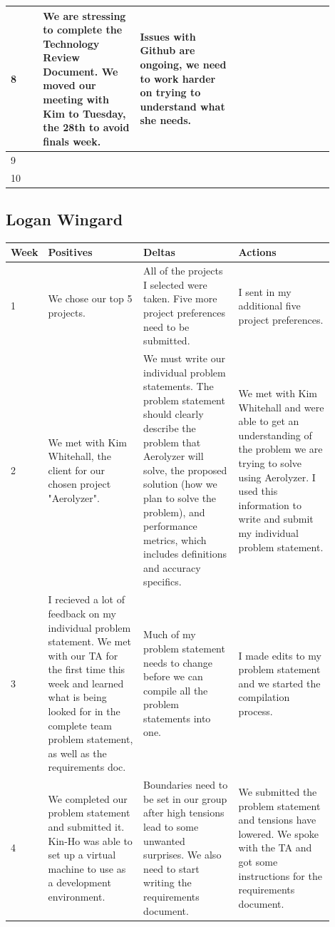 \documentclass[onecolumn, draftclsnofoot,10pt, compsoc]{IEEEtran}
\begin{document}
\begin{singlespace}
\begin{longtable}{|l|p{0.3\linewidth}|p{0.3\linewidth}|p{0.3\linewidth}|}
		8	&
			We are stressing to complete the Technology Review Document.
			We moved our meeting with Kim to Tuesday, the 28th to avoid finals week.
			&
			Issues with Github are ongoing, we need to work harder on trying to understand what she needs.
			&

			\\\hline

		9	&
			&
			&
			\\\hline

		10	&
			&
			&
			\\\hline
		\end{longtable}
		\subsection{Logan Wingard}
		\begin{longtable}{|l|p{0.3\linewidth}|p{0.3\linewidth}|p{0.3\linewidth}|}\hline \textbf{Week} & \textbf{Positives} & \textbf{Deltas} & \textbf{Actions}\\\hline
		1 	& We chose our top 5 projects. & All of the projects I selected were taken. Five more project preferences need to be submitted. & I sent in my additional five project preferences. \\\hline

		2 	& We met with Kim Whitehall, the client for our chosen project "Aerolyzer". & We must write our individual problem statements. The problem statement should clearly describe the problem that Aerolyzer will solve, the proposed solution (how we plan to solve the problem), and performance metrics, which includes definitions and accuracy specifics.  & We met with Kim Whitehall and were able to get an understanding of the problem we are trying to solve using Aerolyzer. I used this information to write and submit my individual problem statement. \\\hline

		3 	& I recieved a lot of feedback on my individual problem statement. We met with our TA for the first time this week and learned what is being looked for in the complete team problem statement, as well as the requirements doc.  & Much of my problem statement needs to change before we can compile all the problem statements into one. & I made edits to my problem statement and we started the compilation process. \\\hline

		4 	& We completed our problem statement and submitted it. Kin-Ho was able to set up a virtual machine to use as a development environment.  & Boundaries need to be set in our group after high tensions lead to some unwanted surprises. We also need to start writing the requirements document. & We submitted the problem statement and tensions have lowered. We spoke with the TA and got some instructions for the requirements document. \\\hline


\end{longtable}
\end{singlespace}
\end{document}
